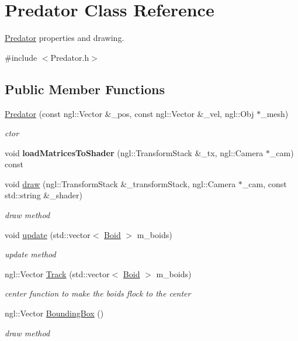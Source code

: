 \hypertarget{classPredator}{
\section{Predator Class Reference}
\label{classPredator}
}


\hyperlink{classPredator}{Predator} properties and drawing.  




{\ttfamily \#include $<$Predator.h$>$}

\subsection*{Public Member Functions}
\begin{DoxyCompactItemize}
\item 
\hyperlink{classPredator_af60206a2ffdf0353d6043f8b5d99787f}{Predator} (const ngl::Vector \&\_\-pos, const ngl::Vector \&\_\-vel, ngl::Obj $\ast$\_\-mesh)
\begin{DoxyCompactList}\small\item\em ctor \end{DoxyCompactList}\item 
\hypertarget{classPredator_a5d62e3c7773b830e468a8a434de1a52c}{
void {\bfseries loadMatricesToShader} (ngl::TransformStack \&\_\-tx, ngl::Camera $\ast$\_\-cam) const }
\label{classPredator_a5d62e3c7773b830e468a8a434de1a52c}

\item 
void \hyperlink{classPredator_ad719b4a294837914fd89927a610627ca}{draw} (ngl::TransformStack \&\_\-transformStack, ngl::Camera $\ast$\_\-cam, const std::string \&\_\-shader)
\begin{DoxyCompactList}\small\item\em draw method \end{DoxyCompactList}\item 
void \hyperlink{classPredator_ae9a1dc6e8c98a3301a284d507df0e989}{update} (std::vector$<$ \hyperlink{classBoid}{Boid} $>$ m\_\-boids)
\begin{DoxyCompactList}\small\item\em update method \end{DoxyCompactList}\item 
\hypertarget{classPredator_a76df0660d23c62918d1123a067795bf7}{
ngl::Vector \hyperlink{classPredator_a76df0660d23c62918d1123a067795bf7}{Track} (std::vector$<$ \hyperlink{classBoid}{Boid} $>$ m\_\-boids)}
\label{classPredator_a76df0660d23c62918d1123a067795bf7}

\begin{DoxyCompactList}\small\item\em center function to make the boids flock to the center \end{DoxyCompactList}\item 
ngl::Vector \hyperlink{classPredator_a93fb6dc551ad71725e79c6ba1275ab02}{BoundingBox} ()
\begin{DoxyCompactList}\small\item\em draw method \end{DoxyCompactList}\end{DoxyCompactItemize}
